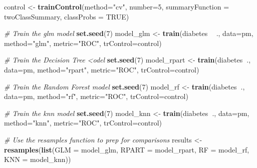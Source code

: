 \documentclass[
]{book}
\newenvironment{Shaded}{\begin{snugshade}}{\end{snugshade}}
\newcommand{\CommentTok}[1]{\textcolor[rgb]{0.56,0.35,0.01}{\textit{#1}}}
\newcommand{\DataTypeTok}[1]{\textcolor[rgb]{0.13,0.29,0.53}{#1}}
\newcommand{\DecValTok}[1]{\textcolor[rgb]{0.00,0.00,0.81}{#1}}
\newcommand{\KeywordTok}[1]{\textcolor[rgb]{0.13,0.29,0.53}{\textbf{#1}}}
\newcommand{\NormalTok}[1]{#1}
\newcommand{\OperatorTok}[1]{\textcolor[rgb]{0.81,0.36,0.00}{\textbf{#1}}}
\newcommand{\OtherTok}[1]{\textcolor[rgb]{0.56,0.35,0.01}{#1}}
\newcommand{\StringTok}[1]{\textcolor[rgb]{0.31,0.60,0.02}{#1}}
\begin{document}
\begin{Shaded}
\begin{Highlighting}[]
\NormalTok{control <-}\StringTok{ }\KeywordTok{trainControl}\NormalTok{(}\DataTypeTok{method=}\StringTok{"cv"}\NormalTok{, }
                        \DataTypeTok{number=}\DecValTok{5}\NormalTok{, }
                        \DataTypeTok{summaryFunction =}\NormalTok{ twoClassSummary,}
                        \DataTypeTok{classProbs =} \OtherTok{TRUE}\NormalTok{)}

\CommentTok{# Train the glm model}
\KeywordTok{set.seed}\NormalTok{(}\DecValTok{7}\NormalTok{)}
\NormalTok{model_glm <-}\StringTok{ }\KeywordTok{train}\NormalTok{(diabetes }\OperatorTok{~}\StringTok{ }\NormalTok{., }
                   \DataTypeTok{data=}\NormalTok{pm, }
                   \DataTypeTok{method=}\StringTok{"glm"}\NormalTok{, }
                   \DataTypeTok{metric=}\StringTok{"ROC"}\NormalTok{,}
                   \DataTypeTok{trControl=}\NormalTok{control)}

\CommentTok{# Train the Decision Tree <odel}
\KeywordTok{set.seed}\NormalTok{(}\DecValTok{7}\NormalTok{)}
\NormalTok{model_rpart <-}\StringTok{ }\KeywordTok{train}\NormalTok{(diabetes}\OperatorTok{~}\NormalTok{., }
                  \DataTypeTok{data=}\NormalTok{pm, }
                  \DataTypeTok{method=}\StringTok{"rpart"}\NormalTok{, }
                  \DataTypeTok{metric=}\StringTok{"ROC"}\NormalTok{,}
                  \DataTypeTok{trControl=}\NormalTok{control)}

\CommentTok{# Train the Random Forest model}
\KeywordTok{set.seed}\NormalTok{(}\DecValTok{7}\NormalTok{)}
\NormalTok{model_rf <-}\StringTok{ }\KeywordTok{train}\NormalTok{(diabetes}\OperatorTok{~}\NormalTok{., }
                  \DataTypeTok{data=}\NormalTok{pm, }
                  \DataTypeTok{method=}\StringTok{"rf"}\NormalTok{, }
                  \DataTypeTok{metric=}\StringTok{"ROC"}\NormalTok{,}
                  \DataTypeTok{trControl=}\NormalTok{control)}

\CommentTok{# Train the knn model}
\KeywordTok{set.seed}\NormalTok{(}\DecValTok{7}\NormalTok{)}
\NormalTok{model_knn <-}\StringTok{ }\KeywordTok{train}\NormalTok{(diabetes}\OperatorTok{~}\NormalTok{., }
                  \DataTypeTok{data=}\NormalTok{pm, }
                  \DataTypeTok{method=}\StringTok{"knn"}\NormalTok{, }
                  \DataTypeTok{metric=}\StringTok{"ROC"}\NormalTok{,}
                  \DataTypeTok{trControl=}\NormalTok{control)}

\CommentTok{# Use the resamples function to prep for comparisons}
\NormalTok{results <-}\StringTok{ }\KeywordTok{resamples}\NormalTok{(}\KeywordTok{list}\NormalTok{(}\DataTypeTok{GLM   =}\NormalTok{ model_glm, }
                          \DataTypeTok{RPART =}\NormalTok{ model_rpart, }
                          \DataTypeTok{RF    =}\NormalTok{ model_rf,}
                          \DataTypeTok{KNN   =}\NormalTok{ model_knn))}
\end{Highlighting}
\end{Shaded}
\end{document}
